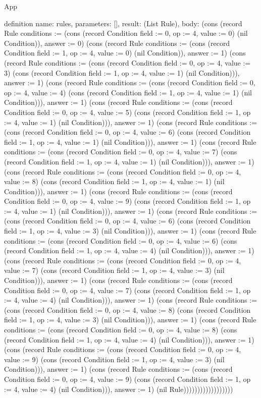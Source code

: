 \begin{lexlean}{App}
\begin{semanticmodule}
definition{
  name: rules,
  parameters: [],
  result: (List Rule),
  body: (cons (record Rule {conditions := (cons (record Condition {field := 0, op := 4, value := 0}) (nil Condition)), answer := 0}) (cons (record Rule {conditions := (cons (record Condition {field := 1, op := 4, value := 0}) (nil Condition)), answer := 1}) (cons (record Rule {conditions := (cons (record Condition {field := 0, op := 4, value := 3}) (cons (record Condition {field := 1, op := 4, value := 1}) (nil Condition))), answer := 1}) (cons (record Rule {conditions := (cons (record Condition {field := 0, op := 4, value := 4}) (cons (record Condition {field := 1, op := 4, value := 1}) (nil Condition))), answer := 1}) (cons (record Rule {conditions := (cons (record Condition {field := 0, op := 4, value := 5}) (cons (record Condition {field := 1, op := 4, value := 1}) (nil Condition))), answer := 1}) (cons (record Rule {conditions := (cons (record Condition {field := 0, op := 4, value := 6}) (cons (record Condition {field := 1, op := 4, value := 1}) (nil Condition))), answer := 1}) (cons (record Rule {conditions := (cons (record Condition {field := 0, op := 4, value := 7}) (cons (record Condition {field := 1, op := 4, value := 1}) (nil Condition))), answer := 1}) (cons (record Rule {conditions := (cons (record Condition {field := 0, op := 4, value := 8}) (cons (record Condition {field := 1, op := 4, value := 1}) (nil Condition))), answer := 1}) (cons (record Rule {conditions := (cons (record Condition {field := 0, op := 4, value := 9}) (cons (record Condition {field := 1, op := 4, value := 1}) (nil Condition))), answer := 1}) (cons (record Rule {conditions := (cons (record Condition {field := 0, op := 4, value := 6}) (cons (record Condition {field := 1, op := 4, value := 3}) (nil Condition))), answer := 1}) (cons (record Rule {conditions := (cons (record Condition {field := 0, op := 4, value := 6}) (cons (record Condition {field := 1, op := 4, value := 4}) (nil Condition))), answer := 1}) (cons (record Rule {conditions := (cons (record Condition {field := 0, op := 4, value := 7}) (cons (record Condition {field := 1, op := 4, value := 3}) (nil Condition))), answer := 1}) (cons (record Rule {conditions := (cons (record Condition {field := 0, op := 4, value := 7}) (cons (record Condition {field := 1, op := 4, value := 4}) (nil Condition))), answer := 1}) (cons (record Rule {conditions := (cons (record Condition {field := 0, op := 4, value := 8}) (cons (record Condition {field := 1, op := 4, value := 3}) (nil Condition))), answer := 1}) (cons (record Rule {conditions := (cons (record Condition {field := 0, op := 4, value := 8}) (cons (record Condition {field := 1, op := 4, value := 4}) (nil Condition))), answer := 1}) (cons (record Rule {conditions := (cons (record Condition {field := 0, op := 4, value := 9}) (cons (record Condition {field := 1, op := 4, value := 3}) (nil Condition))), answer := 1}) (cons (record Rule {conditions := (cons (record Condition {field := 0, op := 4, value := 9}) (cons (record Condition {field := 1, op := 4, value := 4}) (nil Condition))), answer := 1}) (nil Rule))))))))))))))))))
}


\end{semanticmodule}
\end{lexlean}
